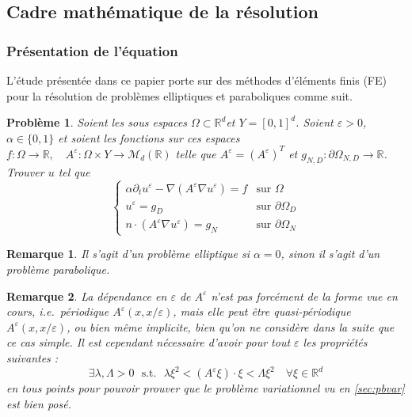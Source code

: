 \documentclass[11pt]{article}
\newtheorem{pb}{Problème}
\newtheorem{rmq}{Remarque}
\newcommand{\R}{\mathbb{R}}
\newcommand{\Ae}{A^\varepsilon}
\newcommand{\ue}{u^\varepsilon}
\newcommand{\ie}{\emph{i.e.{}}~}
\newcommand{\st}{\text{~~s.t.~~}}
\begin{document}
\subsection{Cadre mathématique de la résolution}

\subsubsection{Présentation de l'équation}

L'étude présentée dans ce papier porte sur des méthodes d'éléments finis (FE) pour la résolution de problèmes elliptiques et paraboliques comme suit.

\begin{pb}
  \label{pb:parael}
  Soient les sous espaces $\Omega \subset \R^d$\quad et \quad $Y = [0,1]^d$. Soient $\varepsilon >0$, $\alpha\in \{0, 1\}$ et soient les fonctions sur ces
  espaces $f : \Omega \to \R, \quad \Ae : \Omega\times Y \to \mathcal{M}_d(\R)$  telle que $\Ae  = (\Ae)^T$ \quad et \quad $g_{N,D} : \partial \Omega_{N, D} \to \R$. \\
  Trouver $u$ tel que
  \begin{equation*}
    \begin{cases}
      \alpha \partial_t \ue -\nabla(\Ae \nabla \ue) = f & \text{sur }\Omega\\
      \ue = g_D & \text{sur }\partial \Omega_D \\
      n\cdot(\Ae \nabla \ue) = g_N & \text{sur }\partial \Omega_N
    \end{cases}
  \end{equation*}
\end{pb}

\begin{rmq}
  Il s'agit d'un problème elliptique si $\alpha=0$, sinon il s'agit d'un problème parabolique.
\end{rmq}

\begin{rmq}
  La dépendance en $\varepsilon$ de $\Ae$ n'est pas forcément de la forme vue en cours, \ie périodique $\Ae(x, x/\varepsilon)$, mais elle peut être
  quasi-périodique $\Ae(x, x/\varepsilon)$, ou bien même implicite, bien qu'on ne considère dans la suite que ce cas simple. Il est cependant nécessaire
  d'avoir pour tout $\varepsilon$ les propriétés suivantes :
  \[
    \exists \lambda, \Lambda > 0 \st \lambda \xi^2 < (\Ae \xi) \cdot \xi < \Lambda \xi^2 \quad \forall \xi \in \R^d
  \]
  en tous points pour pouvoir prouver que le problème variationnel vu en \autoref{sec:pbvar} est bien posé.
\end{rmq}
\end{document}
